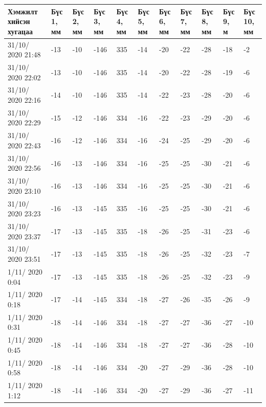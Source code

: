 \begin{table}[h]
    \centering
    \begin{tabular}{|p{1.5cm}|p{0.8cm}|p{0.8cm}|p{0.8cm}|p{0.8cm}|p{0.8cm}|p{0.8cm}|p{0.8cm}|p{0.8cm}|p{0.8cm}|p{0.8cm}|}
         \hline
     Хэмжилт хийсэн хугацаа & Бүс 1, мм&	Бүс 2, мм&	Бүс 3, мм&	Бүс 4, мм&	Бүс 5, мм&	Бүс 6, мм&	Бүс 7, мм&	Бүс 8, мм&	Бүс 9, м&	Бүс 10, мм\\ \hline
31/10/ 2020 21:48&	-13&-10&-146&335&-14&-20&-22&-28&-18&	-2\\ \hline
31/10/ 2020 22:02&	-13&-10&-146&335&-14&-20&-22&-28&-19&	-6\\ \hline
31/10/ 2020 22:16&	-14&-10&-146&335&-14&-22&-23&-28&-20&	-6\\ \hline
31/10/ 2020 22:29&	-15&-12&-146&334&-16&-22&-23&-29&-20&	-6\\ \hline
31/10/ 2020 22:43&	-16&-12&-146&334&-16&-24&-25&-29&-20&	-6\\ \hline
31/10/ 2020 22:56&	-16&-13&-146&334&-16&-25&-25&-30&-21&	-6\\ \hline
31/10/ 2020 23:10&	-16&-13&-146&334&-16&-25&-25&-30&-21&	-6\\ \hline
31/10/ 2020 23:23&	-16&-13&-145&335&-16&-25&-25&-30&-21&	-6\\ \hline
31/10/ 2020 23:37&	-17&-13&-145&335&-18&-26&-25&-31&-23&	-6\\ \hline
31/10/ 2020 23:51&	-17&-13&-145&335&-18&-26&-25&-32&-23&	-7\\ \hline
1/11/ 2020 0:04&	-17&-13&-145&335&-18&-26&-25&-32&-23&	-9\\ \hline
1/11/ 2020 0:18&	-17&-14&-145&334&-18&-27&-26&-35&-26&	-9\\ \hline
1/11/ 2020 0:31&	-18&-14&-146&334&-18&-27&-27&-36&-27&	-10\\ \hline
1/11/ 2020 0:45&	-18&-14&-146&334&-18&-27&-27&-36&-28&	-10\\ \hline
1/11/ 2020 0:58&	-18&-14&-146&334&-20&-27&-29&-36&-28&	-10\\ \hline
1/11/ 2020 1:12&	-18&-14&-146&334&-20&-27&-29&-36&-27&	-11\\ \hline
    \end{tabular}
\end{table}

